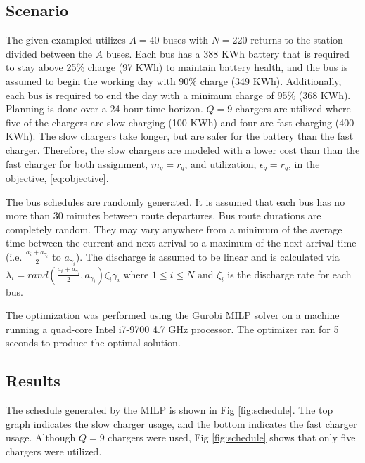 \documentclass[letterpaper, 10pt, conference]{IEEEtran}
\begin{document}
\subsection{Scenario}
The given exampled utilizes \(A = 40\) buses with \(N = 220\) returns to the station divided between the \(A\) buses. Each bus has a 388 KWh battery that is required to stay above 25\% charge (97 KWh) to maintain battery health, and the bus is assumed to begin the working day with 90\% charge (349 KWh). Additionally, each bus is required to end the day with a minimum charge of 95\% (368 KWh). Planning is done over a 24 hour time horizon. \(Q = 9\) chargers are utilized where five of the chargers are slow charging (100 KWh) and four are fast charging (400 KWh). The slow chargers take longer, but are safer for the battery than the fast charger. Therefore, the slow chargers are modeled with a lower cost than than the fast charger for both assignment, \(m_q = r_q\), and utilization, \(\epsilon_q = r_q\), in the objective, \eqref{eq:objective}.

The bus schedules are randomly generated. It is assumed that each bus has no more than 30 minutes between route departures. Bus route durations are completely random. They may vary anywhere from a minimum of the average time between the current and next arrival to a maximum of the next arrival time (i.e. \(\frac{a_i + a_{\gamma_i}}{2}\) to \(a_{\gamma_i}\)). The discharge is assumed to be linear and is calculated via \(\lambda_i = rand(\frac{a_i + a_{\gamma_i}}{2},a_{\gamma_i})\zeta_{i}{\gamma_i}\) where \(1 \leq i \leq N\) and \(\zeta_i\) is the discharge rate for each bus.

The optimization was performed using the Gurobi MILP solver \cite{Hespanha2018} on a machine running a quad-core Intel i7-9700 4.7 GHz processor. The optimizer ran for 5 seconds to produce the optimal solution.

\subsection{Results}
The schedule generated by the MILP is shown in Fig \ref{fig:schedule}. The top graph indicates the slow charger usage, and the bottom indicates the fast charger usage. Although \(Q = 9\) chargers were used, Fig \ref{fig:schedule} shows that only five chargers were utilized. %
\end{document}
